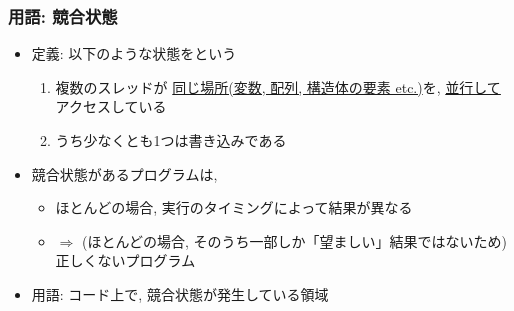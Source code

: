 \documentclass[12pt,dvipdfmx]{beamer}
\begin{document}
\iffalse
\begin{frame}
  \frametitle{用語: 生産者消費者同期 (producer-consumer synchronization)}
  \begin{itemize}
  \item 値を計算($=$生産)するスレッドから使用($=$消費)するスレッドへ,
    正しくデータを受け渡す
  \end{itemize}

  
  これらを見ると, メモリを共有しているから簡単に
  通信(データ共有)が出来るというわけではなさそうとわかる

\end{frame}
\fi


\begin{frame}
  \frametitle{用語: 競合状態}
  \begin{itemize}
  \item [] 定義: 以下のような状態をという
    \begin{enumerate}
    \item 複数のスレッドが
      \underline{同じ場所(変数, 配列, 構造体の要素 etc.)}を, 
      \underline{並行して}
      アクセスしている
    \item うち少なくとも1つは書き込みである
    \end{enumerate}
  \item 競合状態があるプログラムは, 
    \begin{itemize}
    \item ほとんどの場合,  実行のタイミングによって結果が異なる
    \item $\Rightarrow$ 
      (ほとんどの場合, そのうち一部しか「望ましい」結果ではないため)
      正しくないプログラム
    \end{itemize}
  \item 用語: 
    コード上で, 競合状態が発生している領域
  \end{itemize}
\end{frame}
\end{document}
